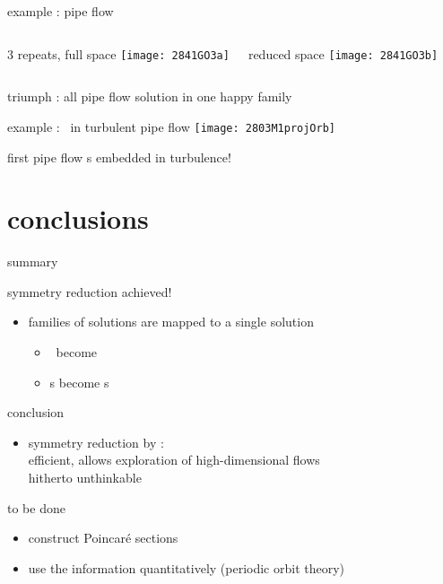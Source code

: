 \begin{frame}{example : pipe flow \rpo}
  \begin{columns}
\begin{block}{3 repeats, full space}
\texttt{[image: 2841GO3a]}%
\end{block}
\begin{block}{reduced space}
\texttt{[image: 2841GO3b]}%
\end{block}
  \end{columns}
\end{frame}

\begin{frame}{triumph : all pipe flow solution in one happy family}
\begin{block}{example : \rpo\ in turbulent pipe flow}
\texttt{[image: 2803M1projOrb]}
\end{block}


\bigskip
first pipe flow \rpo s embedded in turbulence!
\end{frame}

\section[Summary]{conclusions}


\begin{frame}{summary}
\begin{block}{symmetry reduction achieved!}
\begin{itemize}
 \item families of solutions are mapped to a single solution
    \begin{itemize}
 \item \reqva\ become \eqva
 \item \rpo s become \po s
    \end{itemize}
\end{itemize}
\end{block}
\begin{block}{conclusion}
  \begin{itemize}
   \item symmetry reduction by \mslices:
   \\
   efficient, allows
   exploration of high-dimensional flows\\
hitherto unthinkable
  \end{itemize}
\end{block}

\begin{block}{to be done}
\begin{itemize}
  \item construct Poincar\'e sections
  \item use the information quantitatively (periodic orbit theory)
\end{itemize}
\end{block}
\end{frame}


